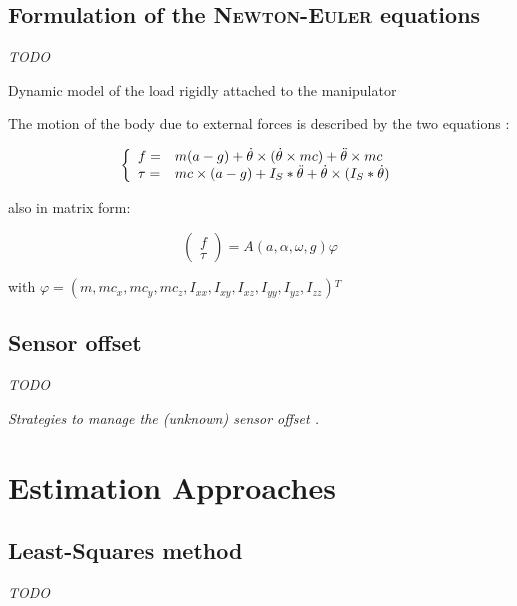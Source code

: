 \documentclass[/home/francois/latex/report/main.tex]{subfiles}
\begin{document}
\subsection{Formulation of the \textsc{Newton-Euler} equations}
\label{subsection:background_newton_equation}

\textit{TODO}

Dynamic model of the load rigidly attached to the manipulator

The motion of the body due to external forces is described by the two equations \cite{Kubus2007, Kubus2008}:

\begin{equation}
 \label{dim_1}
 \left \{
 \begin{array}{l l}
  f =    & m (a - g) + \dot{\theta} \times (\dot{\theta} \times m c) + \ddot{\theta} \times m c \\
  \tau = & m c \times (a - g)
  + I_{S} \ast \ddot{\theta} + \dot{\theta} \times (I_{S} \ast \dot{\theta})
 \end{array}
 \right.
\end{equation}

also in matrix form:

\begin{equation}
 \begin{pmatrix}
  f    \\
  \tau
 \end{pmatrix}
 = A(a, \alpha, \omega, g) \varphi
\end{equation}

with $\varphi = (m, m c_x, m c_y, m c_z, I_{xx}, I_{xy}, I_{xz}, I_{yy}, I_{yz}, I_{zz}) {}^T$

\subsection{Sensor offset}

\textit{TODO}

{\it
Strategies to manage the (unknown) sensor offset \cite{Kubus2007, Kubus2008}.
}

\section{Estimation Approaches}

\subsection{Least-Squares method}

\textit{TODO}
\end{document}
